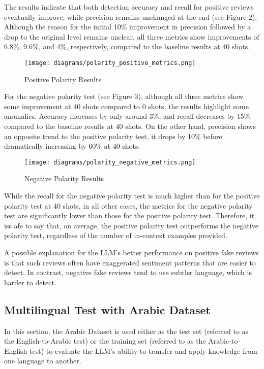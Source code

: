 \documentclass[sigconf, nonacm]{acmart}
\theoremstyle{definition}
\begin{document}
The results indicate that both detection accuracy and recall for positive reviews eventually improve, while precision remains unchanged at the end (see Figure 2). Although the reason for the initial 10\% improvement in precision followed by a drop to the original level remains unclear, all three metrics show improvements of 6.8\%, 9.6\%, and 4\%, respectively, compared to the baseline results at 40 shots.

\begin{figure}[h]
  \centering
  \texttt{[image: diagrams/polarity\_positive\_metrics.png]}
  \caption{Positive Polarity Results}
\end{figure}

For the negative polarity test (see Figure 3), although all three metrics show some improvement at 40 shots compared to 0 shots, the results highlight some anomalies. Accuracy increases by only around 3\%, and recall decreases by 15\% compared to the baseline results at 40 shots. On the other hand, precision shows an opposite trend to the positive polarity test, it drops by 10\% before dramatically increasing by 60\% at 40 shots.

\begin{figure}[h]
  \centering
  \texttt{[image: diagrams/polarity\_negative\_metrics.png]}
  \caption{Negative Polarity Results}
\end{figure}

While the recall for the negative polarity test is much higher than for the positive polarity test at 40 shots, in all other cases, the metrics for the negative polarity test are significantly lower than those for the positive polarity test. Therefore, it iss afe to say that, on average, the positive polarity test outperforms the negative polarity test, regardless of the number of in-context examples provided.

A possible explanation for the LLM's better performance on positive fake reviews is that such reviews often have exaggerated sentiment patterns that are easier to detect. In contrast, negative fake reviews tend to use subtler language, which is harder to detect.

\subsection{Multilingual Test with Arabic Dataset}
In this section, the Arabic Dataset is used either as the test set (referred to as the English-to-Arabic test) or the training set (referred to as the Arabic-to-English test) to evaluate the LLM's ability to transfer and apply knowledge from one language to another.
\end{document}
